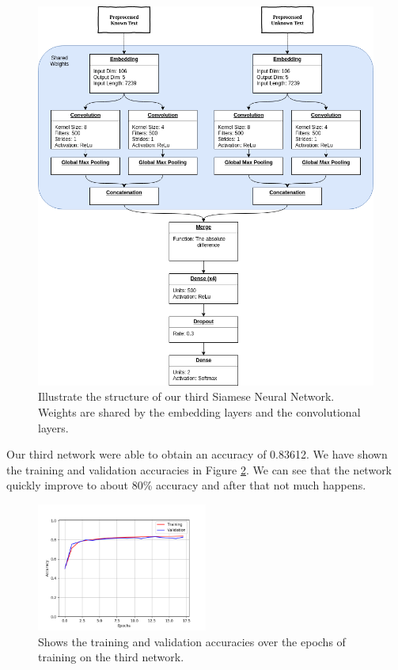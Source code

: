 \begin{figure}
    \centering
    \includegraphics[width=\textwidth]{./pictures/experiments/network3/network3.png}
    \caption{Illustrate the structure of our third Siamese Neural Network.
        Weights are shared by the embedding layers and the convolutional
        layers.}
    \label{fig:network3}
\end{figure}

Our third network were able to obtain an accuracy of 0.83612. We have shown the
training and validation accuracies in Figure \ref{fig:network_3_accuracies}. We
can see that the network quickly improve to about 80\% accuracy and after that
not much happens.

\begin{figure}
    \centering
    \includegraphics[width=0.5\textwidth]{./pictures/experiments/network_3_accuracies.png}
    \caption{Shows the training and validation accuracies over the epochs of
        training on the third network.}
    \label{fig:network_3_accuracies}
\end{figure}

